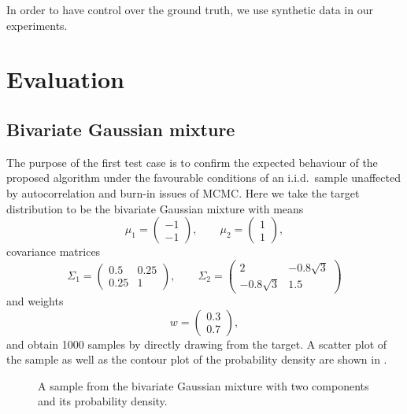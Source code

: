 \documentclass[11pt,a4paper]{report}
\begin{document}
In order to have control over the ground truth, we use synthetic data in our experiments.

\section{Evaluation}

\subsection{Bivariate Gaussian mixture}
\label{sec:gaussian-mixture}

The purpose of the first test case is to confirm the expected behaviour of the proposed algorithm under the favourable conditions of an i.i.d.\ sample unaffected by autocorrelation and burn-in issues of MCMC. Here we take the target distribution to be the bivariate Gaussian mixture with means 
$$
\mu_1 = \begin{pmatrix} -1 \\ -1 \end{pmatrix}, \qquad
\mu_2 = \begin{pmatrix} 1 \\ 1 \end{pmatrix},
$$
covariance matrices
$$
\Sigma_1 = \begin{pmatrix}
0.5 & 0.25\\
0.25 & 1
\end{pmatrix}, \qquad
\Sigma_2 = \begin{pmatrix}
2 & -0.8 \sqrt{3}\\
-0.8 \sqrt{3} & 1.5
\end{pmatrix}
$$
and weights
$$w = \begin{pmatrix} 0.3 \\ 0.7 \end{pmatrix},$$
and obtain 1000 samples by directly drawing from the target. A scatter plot of the sample as well as the contour plot of the probability density are shown in .

\begin{figure}[h]
\centering
{}
\caption{A sample from the bivariate Gaussian mixture with two components and its probability density.
\label{fig:gmm:sample}}
\end{figure}
\end{document}
